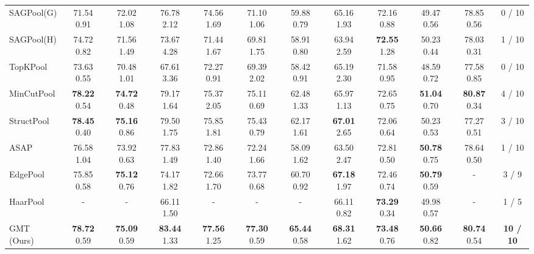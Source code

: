 \documentclass{article} \usepackage{iclr2021_conference,times}
\begin{document}
\begin{table*}[t]
{\begin{tabular}{lccccccccccc}
SAGPool(G) & 71.54  0.91 & 72.02  1.08 & 76.78  2.12 & 74.56  1.69 & 71.10  1.06 & 59.88  0.79 & 65.16  1.93 & 72.16  0.88 & 49.47  0.56 & 78.85  0.56 & 0 / 10 \\
SAGPool(H) & 74.72  0.82 & 71.56  1.49 & 73.67  4.28 & 71.44  1.67 & 69.81  1.75 & 58.91  0.80 & 63.94  2.59 & \textbf{72.55}  1.28 & 50.23  0.44 & 78.03  0.31 & 1 / 10 \\
TopKPool   & 73.63  0.55 & 70.48  1.01 & 67.61  3.36 & 72.27  0.91 & 69.39  2.02 & 58.42  0.91 & 65.19  2.30 & 71.58  0.95 & 48.59  0.72 & 77.58  0.85 & 0 / 10 \\
MinCutPool & \textbf{78.22}  0.54 & \textbf{74.72}  0.48 & 79.17  1.64 & 75.37  2.05 & 75.11  0.69 & 62.48  1.33 & 65.97  1.13 & 72.65  0.75 & \textbf{51.04}  0.70 & \textbf{80.87}  0.34 & 4 / 10 \\
StructPool & \textbf{78.45}  0.40 & \textbf{75.16}  0.86 & 79.50  1.75 & 75.85  1.81 & 75.43  0.79 & 62.17  1.61 & \textbf{67.01}  2.65 & 72.06  0.64 & 50.23   0.53 & 77.27  0.51 &   3 / 10 \\
ASAP       & 76.58  1.04 & 73.92  0.63 & 77.83 1.49 & 72.86  1.40 & 72.24  1.66 & 58.09  1.62 & 63.50  2.47 & 72.81  0.50 & \textbf{50.78}   0.75 & 78.64  0.50 &  1 / 10 \\
EdgePool   & 75.85  0.58 & \textbf{75.12}  0.76 & 74.17 1.82 & 72.66  1.70 & 73.77  0.68 & 60.70  0.92 & \textbf{67.18}  1.97 & 72.46  0.74 & \textbf{50.79}   0.59 &         -        &  3  / 9 \\
HaarPool   &         -        & - & 66.11 1.50 &         -        &         -        &         -        & 66.11  0.82 & \textbf{73.29}  0.34 & 49.98   0.57 &         -        &   1 / 5 \\
\midrule
GMT (Ours) & \textbf{78.72}  0.59 & \textbf{75.09}  0.59 & \textbf{83.44}  1.33 & \textbf{77.56}  1.25 & \textbf{77.30}  0.59 & \textbf{65.44}  0.58 & \textbf{68.31}  1.62 & \textbf{73.48}  0.76 & \textbf{50.66}  0.82 & \textbf{80.74}  0.54 & \bf 10 / 10 \\
\bottomrule
\end{tabular}
}
\vspace{-0.12in}
\label{table:results:chemical}
\end{table*} \begin{figure}[!t]
    \begin{minipage}{0.35\linewidth}
        \centering
\end{minipage}
\end{figure}
\end{document}
